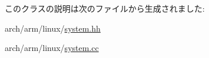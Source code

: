 このクラスの説明は次のファイルから生成されました:\begin{DoxyCompactItemize}
\item 
arch/arm/linux/\hyperlink{arch_2arm_2linux_2system_8hh}{system.hh}\item 
arch/arm/linux/\hyperlink{arch_2arm_2linux_2system_8cc}{system.cc}\end{DoxyCompactItemize}
